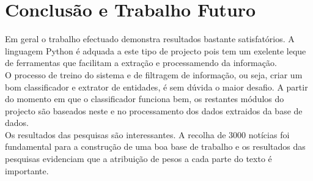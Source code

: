 \section{Conclusão e Trabalho Futuro}
Em geral o trabalho efectuado demonstra resultados bastante satisfatórios. A linguagem Python é adquada a este tipo de projecto pois tem um exelente leque de ferramentas que facilitam a extração e processamendo da informação.\\
O processo de treino do sistema e de filtragem de informação, ou seja, criar um bom classificador e extrator de entidades, é sem dúvida o maior desafio. A partir do momento em que o classificador funciona bem, os restantes módulos do projecto são baseados neste e no processamento dos dados extraidos da base de dados.\\
Os resultados das pesquisas são interessantes. A recolha de 3000 notícias foi fundamental para a construção de uma boa base de trabalho e os resultados das pesquisas evidenciam que a atribuição de pesos a cada parte do texto é importante.\\
